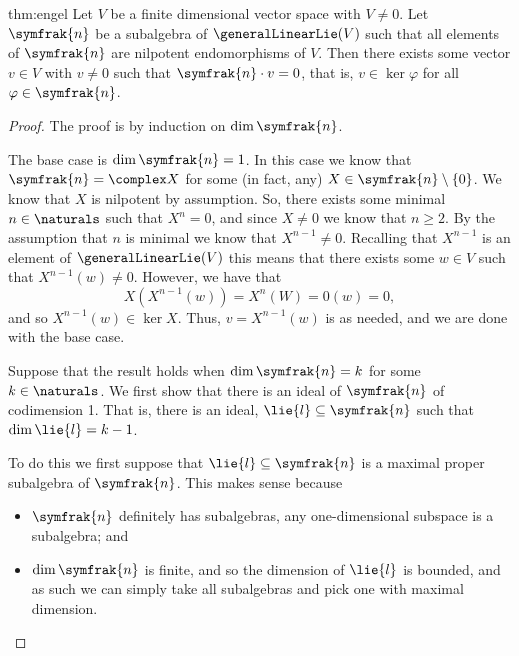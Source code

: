 \documentclass[fleqn]{NotesClass}
\newcommand{\nilpotentLie}{\symfrak{n}}
\begin{document}
    \begin{thm}{}{thm:engel}
        Let \(V\) be a finite dimensional vector space with \(V \ne 0\).
        Let \(\nilpotentLie\) be a subalgebra of \(\generalLinearLie(V)\) such that all elements of \(\nilpotentLie\) are nilpotent endomorphisms of \(V\).
        Then there exists some vector \(v \in V\) with \(v \ne 0\) such that \(\nilpotentLie \cdot v = 0\), that is, \(v \in \ker \varphi\) for all \(\varphi \in \nilpotentLie\).
        \begin{proof}
            The proof is by induction on \(\dim \nilpotentLie\).
            
            The base case is \(\dim \nilpotentLie = 1\).
            In this case we know that \(\nilpotentLie = \complex X\) for some (in fact, any) \(X \in \nilpotentLie \setminus \{0\}\).
            We know that \(X\) is nilpotent by assumption.
            So, there exists some minimal \(n \in \naturals\) such that \(X^n = 0\), and since \(X \ne 0\) we know that \(n \ge 2\).
            By the assumption that \(n\) is minimal we know that \(X^{n-1} \ne 0\).
            Recalling that \(X^{n-1}\) is an element of \(\generalLinearLie(V)\) this means that there exists some \(w \in V\) such that \(X^{n-1}(w) \ne 0\).
            However, we have that
            \begin{equation}
                X(X^{n-1}(w)) = X^n(W) = 0(w) = 0,
            \end{equation}
            and so \(X^{n-1}(w) \in \ker X\).
            Thus, \(v = X^{n-1}(w)\) is as needed, and we are done with the base case.
            
            Suppose that the result holds when \(\dim \nilpotentLie = k\) for some \(k \in \naturals\).
            We first show that there is an ideal of \(\nilpotentLie\) of codimension 1.
            That is, there is an ideal, \(\lie{l} \subseteq \nilpotentLie\) such that \(\dim \lie{l} = k - 1\).
            
            To do this we first suppose that \(\lie{l} \subseteq \nilpotentLie\) is a maximal proper subalgebra of \(\nilpotentLie\).
            This makes sense because
            \begin{itemize}
                \item \(\nilpotentLie\) definitely has subalgebras, any one-dimensional subspace is a subalgebra; and
                \item \(\dim \nilpotentLie\) is finite, and so the dimension of \(\lie{l}\) is bounded, and as such we can simply take all subalgebras and pick one with maximal dimension.
            \end{itemize}
            

\end{proof}
\end{thm}
\end{document}

